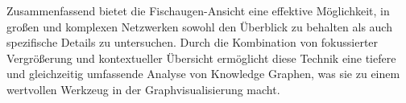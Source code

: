 Zusammenfassend bietet die Fischaugen-Ansicht eine effektive Möglichkeit, in großen und komplexen Netzwerken sowohl den Überblick zu behalten als auch spezifische Details zu untersuchen. Durch die Kombination von fokussierter Vergrößerung und kontextueller Übersicht ermöglicht diese Technik eine tiefere und gleichzeitig umfassende Analyse von Knowledge Graphen, was sie zu einem wertvollen Werkzeug in der Graphvisualisierung macht.